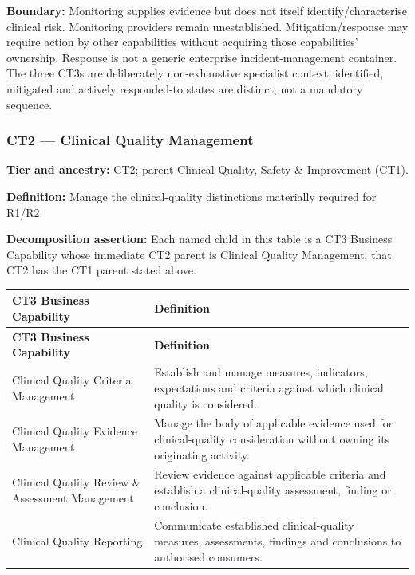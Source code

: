 \textbf{Boundary:} Monitoring supplies evidence but does not itself identify/\allowbreak{}characterise clinical risk. Monitoring providers remain unestablished. Mitigation/\allowbreak{}response may require action by other capabilities without acquiring those capabilities’ ownership. Response is not a generic enterprise incident-management container. The three CT3s are deliberately non-exhaustive specialist context; identified, mitigated and actively responded-to states are distinct, not a mandatory sequence.

\label{rad:business:546}
\subsubsection*{CT2 — Clinical Quality Management}
\label{rad:business:548}

\textbf{Tier and ancestry:} CT2; parent Clinical Quality, Safety \& Improvement (CT1).

\label{rad:business:550}

\textbf{Definition:} Manage the clinical-quality distinctions materially required for R1/\allowbreak{}R2.

\label{rad:business:552}

\textbf{Decomposition assertion:} Each named child in this table is a CT3 Business Capability whose immediate CT2 parent is Clinical Quality Management; that CT2 has the CT1 parent stated above.

\label{rad:business:554}
\begingroup\small\setlength{\TableWidth}{\dimexpr\linewidth-4\tabcolsep-3\arrayrulewidth\relax}
\begin{longtable}{|>{\raggedright\arraybackslash}p{0.35\TableWidth}|>{\raggedright\arraybackslash}p{0.65\TableWidth}|}
\hline\rowcolor{TableHead}\textbf{CT3 Business Capability} & \textbf{Definition}\\\hline\endfirsthead
\hline\rowcolor{TableHead}\textbf{CT3 Business Capability} & \textbf{Definition}\\\hline\endhead
\hline\endfoot
Clinical Quality Criteria Management & Establish and manage measures, indicators, expectations and criteria against which clinical quality is considered.\\\hline
Clinical Quality Evidence Management & Manage the body of applicable evidence used for clinical-quality consideration without owning its originating activity.\\\hline
Clinical Quality Review \& Assessment Management & Review evidence against applicable criteria and establish a clinical-quality assessment, finding or conclusion.\\\hline
Clinical Quality Reporting & Communicate established clinical-quality measures, assessments, findings and conclusions to authorised consumers.\\\hline
\end{longtable}\endgroup
{}\label{rad:business:561}

